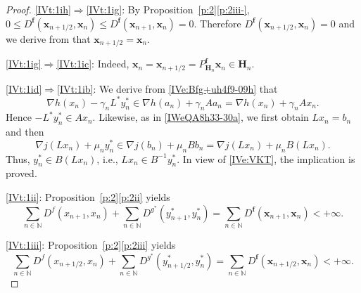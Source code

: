 \documentclass[a4paper,11pt,fleqn]{article}
\renewcommand{\leq}{\ensuremath{\leqslant}}
\newcommand{\NN}{\ensuremath{\mathbb N}}
\newcommand{\pinf}{\ensuremath{{+\infty}}}
\theoremstyle{plain}{\theorembodyfont{\rmfamily}%
\newtheorem{conjecture}[theorem]{Conjecture}}
\theoremstyle{plain}{\theorembodyfont{\rmfamily}%
\newtheorem{example}[theorem]{Example}}
\theoremstyle{plain}{\theorembodyfont{\rmfamily}%
\newtheorem{remark}[theorem]{Remark}}
\theoremstyle{plain}{\theorembodyfont{\rmfamily}%
\newtheorem{algorithm}[theorem]{Algorithm}}
\theoremstyle{plain}{\theorembodyfont{\rmfamily}%
\newtheorem{condition}[theorem]{Condition}}
\theoremstyle{plain}{\theorembodyfont{\rmfamily}%
\newtheorem{definition}[theorem]{Definition}}
\theoremstyle{plain}{\theorembodyfont{\rmfamily}
\newtheorem{problem}[theorem]{Problem}}
\theoremstyle{plain}{\theorembodyfont{\rmfamily}
\newtheorem{notation}[theorem]{Notation}}
\numberwithin{equation}{section}
\begin{document}
\begin{proof}
\ref{IVt:1ih}$\Rightarrow$\ref{IVt:1ig}:  By
Proposition~\ref{p:2}\ref{p:2iii-},
$0\leq D^{\boldsymbol{f}}(\boldsymbol{x}_{n+1/2},\boldsymbol{x}_n)
\leq D^{\boldsymbol{f}}(\boldsymbol{x}_{n+1},\boldsymbol{x}_n)=0$.
Therefore 
$D^{\boldsymbol{f}}(\boldsymbol{x}_{n+1/2},\boldsymbol{x}_n)=0$
and we derive from \cite[Lemma~7.3(vi)]{Ccm01}
that $\boldsymbol{x}_{n+1/2}=\boldsymbol{x}_n$.

\ref{IVt:1ig}$\Rightarrow$\ref{IVt:1ic}: Indeed,
$\boldsymbol{x}_n=\boldsymbol{x}_{n+1/2}=
P^{\boldsymbol{f}}_{\boldsymbol{H}_n}
\boldsymbol{x}_n\in\boldsymbol{H}_n$.

\ref{IVt:1id}$\Rightarrow$\ref{IVt:1ib}: 
We derive from \eqref{IVe:Bfg+uh4f9-09h} that
\begin{equation}
\label{IWeQA8h33-30c}
\nabla h(x_n)-\gamma_n L^*y_n^*\in\nabla h(a_n)+\gamma_n Aa_n
=\nabla h(x_n)+\gamma_n Ax_n. 
\end{equation}
Hence $-L^*y_n^*\in Ax_n$. Likewise, as in 
\eqref{IWeQA8h33-30a}, we first obtain $Lx_n=b_n$ and then
\begin{equation}
\label{IWeQA8h33-30d}
\nabla j(Lx_n)+\mu_n y_n^*\in\nabla j(b_n)+\mu_n Bb_n
=\nabla j(Lx_n)+\mu_n B(Lx_n).
\end{equation}
Thus, $y_n^*\in B(Lx_n)$, i.e., $Lx_n\in B^{-1}y_n^*$.
In view of \eqref{IVe:VKT}, the implication is proved.

\ref{IVt:1ii}: 
Proposition~\ref{p:2}\ref{p:2ii} yields
\begin{equation}
\label{IVe:2312b}
\sum_{n\in\NN}D^f(x_{n+1},x_n)+\sum_{n\in\NN}D^{g^*}(y_{n+1}^*,y_n^*)
=\sum_{n\in\NN}D^{\boldsymbol{f}}(\boldsymbol{x}_{n+1},
\boldsymbol{x}_n)<\pinf.
\end{equation}

\ref{IVt:1iii}: Proposition~\ref{p:2}\ref{p:2iii} yields 
\begin{equation}
\sum_{n\in\NN}D^f(x_{n+1/2},x_n)
+\sum_{n\in\NN}D^{g^*}(y_{n+1/2}^*,y_n^*)=
\sum_{n\in\NN}D^{\boldsymbol{f}}(\boldsymbol{x}_{n+1/2},
\boldsymbol{x}_n)<\pinf.
\end{equation}


\end{proof}
\end{document}
